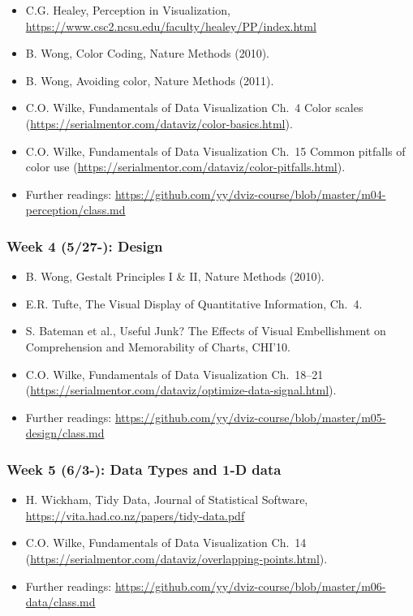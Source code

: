 \begin{itemize}\itemsep0em 
\item C.G. Healey, Perception in Visualization, \url{https://www.csc2.ncsu.edu/faculty/healey/PP/index.html}
\item B. Wong, Color Coding, Nature Methods (2010).
\item B. Wong, Avoiding color, Nature Methods (2011). 
\item C.O. Wilke, Fundamentals of Data Visualization Ch.~4 Color scales (\url{https://serialmentor.com/dataviz/color-basics.html}). 
\item C.O. Wilke, Fundamentals of Data Visualization Ch.~15 Common pitfalls of color use (\url{https://serialmentor.com/dataviz/color-pitfalls.html}).
\item Further readings: \url{https://github.com/yy/dviz-course/blob/master/m04-perception/class.md}
\end{itemize}	
\subsubsection{Week 4 (5/27-): Design }%

\begin{itemize}\itemsep0em 
\item B. Wong, Gestalt Principles I \& II, Nature Methods (2010). 
\item E.R. Tufte, The Visual Display of Quantitative Information, Ch.~4.
\item S. Bateman et al., Useful Junk? The Effects of Visual Embellishment on Comprehension and Memorability of Charts, CHI'10.
\item C.O. Wilke, Fundamentals of Data Visualization Ch.~18--21 (\url{https://serialmentor.com/dataviz/optimize-data-signal.html}). 
\item Further readings: \url{https://github.com/yy/dviz-course/blob/master/m05-design/class.md}
\end{itemize}	
\subsubsection{Week 5 (6/3-): Data Types and 1-D data } %

\begin{itemize}\itemsep0em 
\item H. Wickham, Tidy Data, Journal of Statistical Software, \url{https://vita.had.co.nz/papers/tidy-data.pdf}
\item C.O. Wilke, Fundamentals of Data Visualization Ch.~14 (\url{https://serialmentor.com/dataviz/overlapping-points.html}). 
\item Further readings: \url{https://github.com/yy/dviz-course/blob/master/m06-data/class.md}
\end{itemize}	
